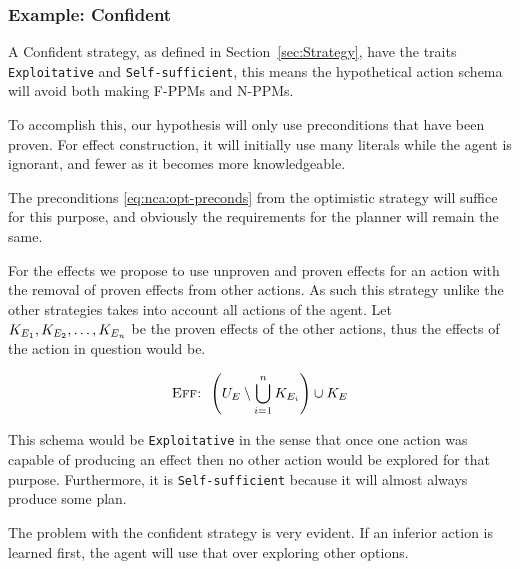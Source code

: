\documentclass[\master/Master.tex]{subfiles}
\begin{document}
\subsubsection{Example: Confident}

A Confident strategy, as defined in Section~\ref{sec:Strategy}, have the traits \texttt{Exploitative} and \texttt{Self-sufficient},
this means the hypothetical action schema will avoid both making F-PPMs and N-PPMs. 

To accomplish this, our hypothesis will only use preconditions that have been proven.
For effect construction, it will initially use many literals while the agent is ignorant, and fewer as it becomes more knowledgeable. 

The preconditions \eqref{eq:nca:opt-preconds} from the optimistic strategy will suffice for this purpose, and obviously the requirements for the planner will remain the same.

For the effects we propose to use unproven and proven effects for an action with the removal of proven effects from other actions. 
As such this strategy unlike the other strategies takes into account all actions of the agent.
Let $K_{E_1},K_{E_2},\dots,K_{E_n}$ be the proven effects of the other actions, thus the effects of the action in question would be.

\begin{equation}
		\textsc{Eff: } \left( U_E \setminus \bigcup \limits_{i = 1} ^n K_{E_i} \right) \cup K_E
\end{equation}

This schema would be \texttt{Exploitative} in the sense that once one action was capable of producing an effect then no other action would be explored for that purpose. 
Furthermore, it is \texttt{Self-sufficient} because it will almost always produce some plan.

The problem with the confident strategy is very evident. If an inferior action is learned first, the agent will use that over exploring other options.
\end{document}
